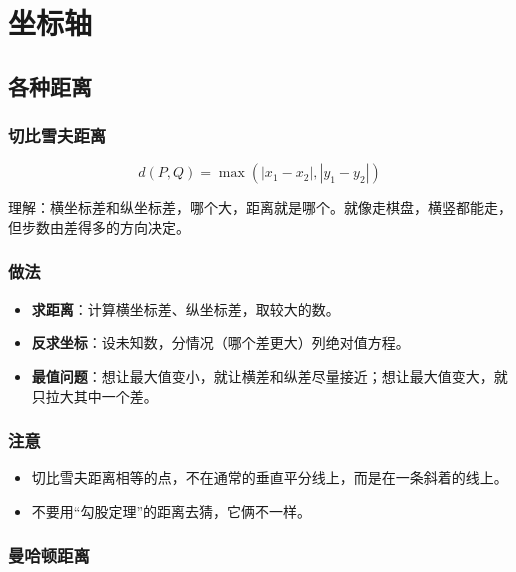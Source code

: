 \chapter{坐标轴}

\section{各种距离}

\subsection{切比雪夫距离}

\begin{definition} \label{def:int} 
\[
d(P, Q) = \max(|x_1 - x_2|, |y_1 - y_2|)
\]

理解：横坐标差和纵坐标差，哪个大，距离就是哪个。就像走棋盘，横竖都能走，但步数由差得多的方向决定。

\subsection*{做法}
\begin{itemize}
    \item \textbf{求距离}：计算横坐标差、纵坐标差，取较大的数。
    \item \textbf{反求坐标}：设未知数，分情况（哪个差更大）列绝对值方程。
    \item \textbf{最值问题}：想让最大值变小，就让横差和纵差尽量接近；想让最大值变大，就只拉大其中一个差。
\end{itemize}

\subsection*{注意}

\begin{itemize}
    \item 切比雪夫距离相等的点，不在通常的垂直平分线上，而是在一条斜着的线上。
    \item 不要用“勾股定理”的距离去猜，它俩不一样。
\end{itemize}

\end{definition}


\subsection{曼哈顿距离}

